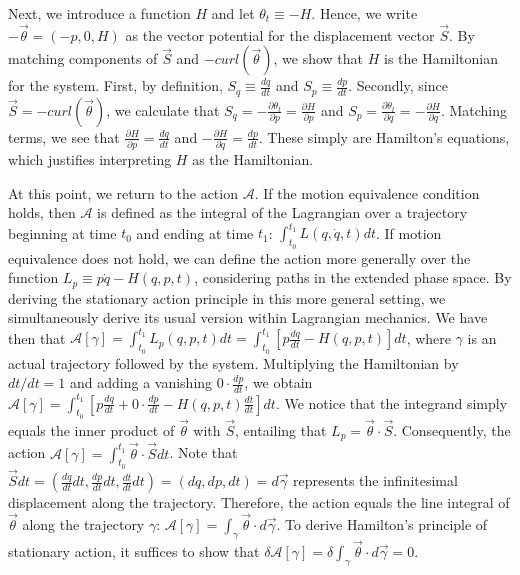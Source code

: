 \documentclass[12pt, english, twoside]{article} %
\renewcommand{\vector}[1]{\ensuremath{\vec{#1}}} %
\newcommand{\integral}{\int}
\begin{document}
Next, we introduce a function $H$ and let $ \theta_t \equiv -H$. Hence, we write $-\vector{\theta} = (-p, 0, H) $ as the vector potential for the displacement vector $\vector{S} $. By matching components of $\vector{S}$ and $-curl(\vector{\theta})$, we show that $H$ is the Hamiltonian for the system. First, by definition, $S_q \equiv \frac{dq}{dt} $ and $S_p \equiv  \frac{dp}{dt} $. Secondly, since $\vector{S} = -curl(\vector{\theta}) $, we calculate that $S_q = -\frac{\partial \theta_t}{\partial p} = \frac{\partial H}{\partial p}$ and $S_p = \frac{\partial \theta_t}{\partial q}=-\frac{\partial H}{\partial q}$. Matching terms, we see that $\frac{\partial H}{\partial p} =\frac{dq}{dt} $ and $-\frac{\partial H}{\partial q} =\frac{dp}{dt}$. These simply are Hamilton's equations, which justifies interpreting $H$ as the Hamiltonian.

At this point, we return to the action $ \mathscr{A}$. If the motion equivalence condition holds, then $ \mathscr{A}$ is defined as the integral of the Lagrangian over a trajectory beginning at time $t_0$ and ending at time $t_1$: $\integral^{t_1}_{t_0} L (q, \dot{q}, t) dt$. If motion equivalence does not hold, we can define the action more generally over the function $L_p \equiv p \dot{q} - H(q, p, t)$, considering paths in the extended phase space. By deriving the stationary action principle in this more general setting, we simultaneously derive its usual version within Lagrangian mechanics. We have then that $ \mathscr{A}[\gamma] = \integral^{t_1}_{t_0} L_p (q, p, t) dt = \integral^{t_1}_{t_0} [p \frac{dq}{dt} - H(q, p, t) ]dt$, where $\gamma$ is an actual trajectory followed by the system. Multiplying the Hamiltonian by $dt/dt = 1$ and adding a vanishing $0 \cdot \frac{dp}{dt}$, we obtain $ \mathscr{A}[\gamma] = \integral^{t_1}_{t_0} [p \frac{dq}{dt} + 0 \cdot \frac{dp}{dt} - H(q, p, t) \frac{dt}{dt} ]dt$. We notice that the integrand simply equals the inner product of $\vector{\theta}$ with $\vector{S} $, entailing that $L_p =\vector{\theta} \cdot \vector{S} $. Consequently, the action $ \mathscr{A} [\gamma] = \integral^{t_1}_{t_0} \vector{\theta} \cdot \vector{S}  dt$. Note that $\vector{S}  dt = (\frac{d q }{d t } dt, \frac{d p }{d t } dt, \frac{d t }{d t }dt ) = (dq, dp, dt) = d\vector{\gamma}$ represents the infinitesimal displacement along the trajectory. Therefore, the action equals the line integral of $\vector{\theta}$ along the trajectory $\gamma $: $ \mathscr{A} [\gamma] =\integral_{\gamma} \vector{\theta} \cdot d\vector{\gamma}$. To derive Hamilton's principle of stationary action, it suffices to show that $\delta \mathscr{A} [\gamma] =\delta \integral_{\gamma} \vector{\theta} \cdot d\vector{\gamma} = 0$. 
\end{document}
